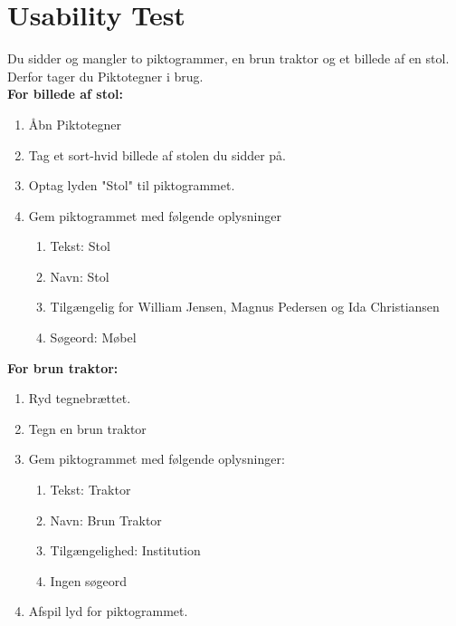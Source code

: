 \documentclass[12pt,a4paper]{report}
\begin{document}
\section*{Usability Test}
Du sidder og mangler to piktogrammer, en brun traktor og et billede af en stol. Derfor tager du Piktotegner i brug.\\
\textbf{For billede af stol:}
\begin{enumerate}
     \item Åbn Piktotegner
     \item Tag et sort-hvid billede af stolen du sidder på.
     \item Optag lyden "Stol" til piktogrammet.
     \item Gem piktogrammet med følgende oplysninger
         \begin{enumerate}
          \item Tekst: Stol
          \item Navn: Stol
          \item Tilgængelig for William Jensen, Magnus Pedersen og Ida Christiansen
          \item Søgeord: Møbel
     \end{enumerate}
\end{enumerate}

\textbf{For brun traktor:}
\begin{enumerate}
     \item Ryd tegnebrættet.
     \item Tegn en brun traktor
     \item Gem piktogrammet med følgende oplysninger:
     \begin{enumerate}
          \item Tekst: Traktor
          \item Navn: Brun Traktor
          \item Tilgængelighed: Institution
          \item Ingen søgeord
     \end{enumerate}
     \item Afspil lyd for piktogrammet.
\end{enumerate}





\end{document}
